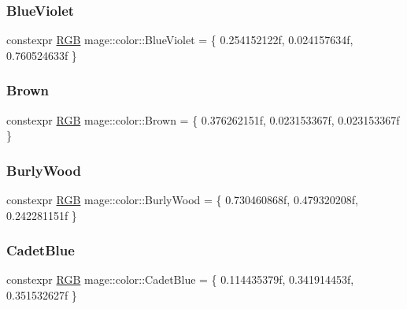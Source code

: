 \subsubsection{\texorpdfstring{Blue\+Violet}{BlueViolet}}
{\footnotesize\ttfamily constexpr \hyperlink{structmage_1_1_r_g_b}{R\+GB} mage\+::color\+::\+Blue\+Violet = \{ 0.\+254152122f, 0.\+024157634f, 0.\+760524633f \}}

\hypertarget{namespacemage_1_1color_ae17f4f7f2abb3b569dcda75a56a6e0fc}{}\label{namespacemage_1_1color_ae17f4f7f2abb3b569dcda75a56a6e0fc} 
\subsubsection{\texorpdfstring{Brown}{Brown}}
{\footnotesize\ttfamily constexpr \hyperlink{structmage_1_1_r_g_b}{R\+GB} mage\+::color\+::\+Brown = \{ 0.\+376262151f, 0.\+023153367f, 0.\+023153367f \}}

\hypertarget{namespacemage_1_1color_ad61a0cb85a0718f107d24a9ccb14f7a9}{}\label{namespacemage_1_1color_ad61a0cb85a0718f107d24a9ccb14f7a9} 
\subsubsection{\texorpdfstring{Burly\+Wood}{BurlyWood}}
{\footnotesize\ttfamily constexpr \hyperlink{structmage_1_1_r_g_b}{R\+GB} mage\+::color\+::\+Burly\+Wood = \{ 0.\+730460868f, 0.\+479320208f, 0.\+242281151f \}}

\hypertarget{namespacemage_1_1color_a9db1c95bad4c8f3a056b2b1b09bd1e90}{}\label{namespacemage_1_1color_a9db1c95bad4c8f3a056b2b1b09bd1e90} 
\subsubsection{\texorpdfstring{Cadet\+Blue}{CadetBlue}}
{\footnotesize\ttfamily constexpr \hyperlink{structmage_1_1_r_g_b}{R\+GB} mage\+::color\+::\+Cadet\+Blue = \{ 0.\+114435379f, 0.\+341914453f, 0.\+351532627f \}}

\hypertarget{namespacemage_1_1color_a4d4898d5a83df8e62ac4d1062771f710}{}\label{namespacemage_1_1color_a4d4898d5a83df8e62ac4d1062771f710} 
